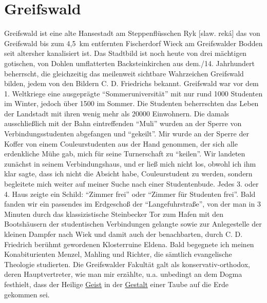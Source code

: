 \section{Greifswald}
Greifswald ist eine alte Hansestadt am Steppenflüsschen Ryk [slaw. reká] das von Greifswald bis zum 4,5~km entfernten Fischerdorf Wieck am Greifswalder Bodden seit altersher kanalisiert ist. Das Stadtbild ist noch heute von drei mächtigen gotischen, von Dohlen umflatterten Backsteinkirchen aus dem./14. Jahrhundert beherrscht, die gleichzeitig das meilenweit sichtbare Wahrzeichen Greifswald bilden, jedem von den Bildern C. D. Friedrichs bekannt. Greifswald war vor dem 1. Weltkriege eine ausgeprägte \enquote{Sommeruniversität} mit nur rund \num{1000} Studenten im Winter, jedoch über \num{1500} im Sommer. Die Studenten beherrschten das Leben der Landstadt mit ihren wenig mehr als \num{20000} Einwohnern. Die damals ausschließlich mit der Bahn eintreffenden \enquote{Muli} wurden an der Sperre von Verbindungsstudenten abgefangen und \enquote{gekeilt}. Mir wurde an der Sperre der Koffer von einem Couleurstudenten aus der Hand genommen, der sich alle erdenkliche Mühe gab, mich für seine Turnerschaft zu \enquote{keilen}. Wir landeten zunächst in seinem Verbindungshaus, und er ließ mich nicht los, obwohl ich ihm klar sagte, dass ich nicht die Absicht habe, Couleurstudent zu werden, sondern begleitete mich weiter auf meiner Suche nach einer Studentenbude. Jedes 3. oder 4. Haus zeigte ein Schild: \enquote{Zimmer frei} oder \enquote{Zimmer für Studenten frei}. Bald fanden wir ein passendes im Erdgeschoß der \enquote{Langefuhrstraße}, von der man in 3 Minuten durch das klassizistische Steinbecker Tor zum Hafen mit den Bootshäusern der studentischen Verbindungen gelangte sowie zur Anlegestelle der kleinen Dampfer nach Wiek und damit auch der benachbarten, durch C. D. Friedrich berühmt gewordenen Klosterruine Eldena. Bald begegnete ich meinen Konabiturienten Menzel, Mahling und Richter, die sämtlich evangelische Theologie studierten. Die Greifswalder Fakultät galt als konservativ-orthodox, deren Hauptvertreter, wie man mir erzählte, u.a. unbedingt an dem Dogma festhielt, dass der Heilige \underline{Geist} in der \underline{Gestalt} einer Taube auf die Erde gekommen sei.

